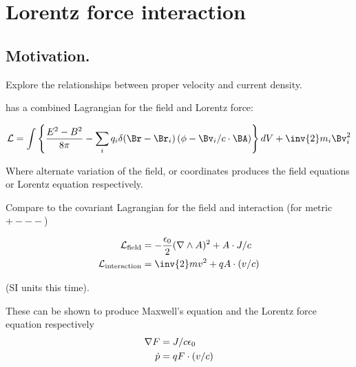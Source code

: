 
%
%



\chapter{Lorentz force interaction } %
\date{ October 17, 2008.  Last Revision: $Date: 2009/06/04 12:52:02 $ }

%


\section{Motivation.}

Explore the relationships between proper velocity and current density.

\cite{goldstein1951cm} has a combined Lagrangian for the field and Lorentz force:

\begin{align*}
\LL = \int \left\{ \frac{E^2 - B^2}{8 \pi} - \sum_i q_i \delta(\Br-\Br_i)\left(\phi - \Bv_i/c \cdot \BA\right)\right\} dV + \inv{2} m_i \Bv_i^2
\end{align*}

Where alternate variation of the field, or coordinates produces the field equations or Lorentz equation respectively.

Compare to the covariant Lagrangian for the field and interaction (for metric $+---$)

\begin{align}\label{eqn:lorentz_tx_em_potential:maxlag}
\LL_{\text{field}} &= -\frac{\epsilon_0}{2} (\grad \wedge A)^2 + A \cdot J/c \\
\LL_{\text{interaction}} &= \inv{2} m v^2 + q A \cdot (v/c)
\end{align}

(SI units this time).

These can be shown to produce Maxwell's equation and the Lorentz force equation respectively
\begin{align}
\nabla F &= J/c\epsilon_0 \\
\dot{p} &= q F \cdot (v/c)
\end{align}

